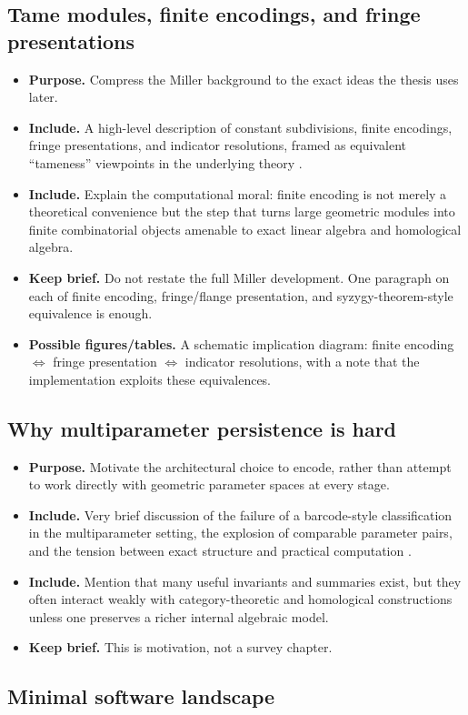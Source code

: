 \documentclass[11pt]{article}
\newenvironment{plan}{\begin{itemize}[leftmargin=1.6em,itemsep=0.35em,topsep=0.25em]}{\end{itemize}}
\newcommand{\purpose}[1]{\item \textbf{Purpose.} #1}
\newcommand{\includeitems}[1]{\item \textbf{Include.} #1}
\newcommand{\keepbrief}[1]{\item \textbf{Keep brief.} #1}
\newcommand{\figures}[1]{\item \textbf{Possible figures/tables.} #1}
\begin{document}
\subsection{Tame modules, finite encodings, and fringe presentations}

\begin{plan}
    \purpose{Compress the Miller background to the exact ideas the thesis uses later.}
    \includeitems{A high-level description of constant subdivisions, finite encodings, fringe presentations, and indicator resolutions, framed as equivalent ``tameness'' viewpoints in the underlying theory \cite{Mil20}.}
    \includeitems{Explain the computational moral: finite encoding is not merely a theoretical convenience but the step that turns large geometric modules into finite combinatorial objects amenable to exact linear algebra and homological algebra.}
    \keepbrief{Do not restate the full Miller development. One paragraph on each of finite encoding, fringe/flange presentation, and syzygy-theorem-style equivalence is enough.}
    \figures{A schematic implication diagram: finite encoding $\Longleftrightarrow$ fringe presentation $\Longleftrightarrow$ indicator resolutions, with a note that the implementation exploits these equivalences.}
\end{plan}

\subsection{Why multiparameter persistence is hard}

\begin{plan}
    \purpose{Motivate the architectural choice to encode, rather than attempt to work directly with geometric parameter spaces at every stage.}
    \includeitems{Very brief discussion of the failure of a barcode-style classification in the multiparameter setting, the explosion of comparable parameter pairs, and the tension between exact structure and practical computation \cite{CZ09,Les15,CDSGO16}.}
    \includeitems{Mention that many useful invariants and summaries exist, but they often interact weakly with category-theoretic and homological constructions unless one preserves a richer internal algebraic model.}
    \keepbrief{This is motivation, not a survey chapter.}
\end{plan}

\subsection{Minimal software landscape}
\end{document}
